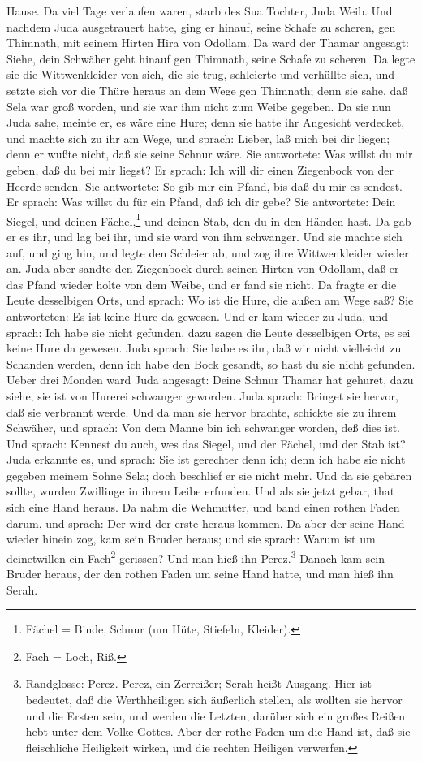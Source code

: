 \begin{schriftzitat}
Hause. Da viel Tage verlaufen waren, starb des Sua Tochter, Juda Weib. Und nachdem Juda ausgetrauert hatte, ging er hinauf, seine Schafe zu scheren, gen Thimnath, mit seinem Hirten Hira von Odollam. Da ward der Thamar angesagt: Siehe, dein Schwäher geht hinauf gen Thimnath, seine Schafe zu scheren. Da legte sie die Wittwenkleider von sich, die sie trug, schleierte und verhüllte sich, und setzte sich vor die Thüre heraus an dem Wege gen Thimnath; denn sie sahe, daß Sela war groß worden, und sie war ihm nicht zum Weibe gegeben. Da sie nun Juda sahe, meinte er, es wäre eine Hure; denn sie hatte ihr Angesicht verdecket, und machte sich zu ihr am Wege, und sprach: Lieber, laß mich bei dir liegen; denn er wußte nicht, daß sie seine Schnur wäre. Sie antwortete: Was willst du mir geben, daß du bei mir liegst? Er sprach: Ich will dir einen Ziegenbock von der Heerde senden. Sie antwortete: So gib mir ein Pfand, bis daß du mir es sendest. Er sprach: Was willst du für ein Pfand, daß ich dir gebe? Sie antwortete: Dein Siegel, und deinen Fächel,\footnote{Fächel = Binde, Schnur (um Hüte, Stiefeln, Kleider).} und deinen Stab, den du in den Händen hast. Da gab er es ihr, und lag bei ihr, und sie ward von ihm schwanger. Und sie machte sich auf, und ging hin, und legte den Schleier ab, und zog ihre Wittwenkleider wieder an. Juda aber sandte den Ziegenbock durch seinen Hirten von Odollam, daß er das Pfand wieder holte von dem Weibe, und er fand sie nicht. Da fragte er die Leute desselbigen Orts, und sprach: Wo ist die Hure, die außen am Wege saß? Sie antworteten: Es ist keine Hure da gewesen. Und er kam wieder zu Juda, und sprach: Ich habe sie nicht gefunden, dazu sagen die Leute desselbigen Orts, es sei keine Hure da gewesen. Juda sprach: Sie habe es ihr, daß wir nicht vielleicht zu Schanden werden, denn ich habe den Bock gesandt, so hast du sie nicht gefunden. Ueber drei Monden ward Juda angesagt: Deine Schnur Thamar hat gehuret, dazu siehe, sie ist von Hurerei schwanger geworden. Juda sprach: Bringet sie hervor, daß sie verbrannt werde. Und da man sie hervor brachte, schickte sie zu ihrem Schwäher, und sprach: Von dem Manne bin ich schwanger worden, deß dies ist. Und sprach: Kennest du auch, wes das Siegel, und der Fächel, und der Stab ist? Juda erkannte es, und sprach: Sie ist gerechter denn ich; denn ich habe sie nicht gegeben meinem Sohne Sela; doch beschlief er sie nicht mehr. Und da sie gebären sollte, wurden Zwillinge in ihrem Leibe erfunden. Und als sie jetzt gebar, that sich eine Hand heraus. Da nahm die Wehmutter, und band einen rothen Faden darum, und sprach: Der wird der erste heraus kommen. Da aber der seine Hand wieder hinein zog, kam sein Bruder heraus; und sie sprach: Warum ist um deinetwillen ein Fach\footnote{Fach = Loch, Riß.} gerissen? Und man hieß ihn Perez.\footnote{Randglosse: Perez. Perez, ein Zerreißer; Serah heißt Ausgang. Hier ist bedeutet, daß die Werthheiligen sich äußerlich stellen, als wollten sie hervor und die Ersten sein, und werden die Letzten, darüber sich ein großes Reißen hebt unter dem Volke Gottes. Aber der rothe Faden um die Hand ist, daß sie fleischliche Heiligkeit wirken, und die rechten Heiligen verwerfen.} Danach kam sein Bruder heraus, der den rothen Faden um seine Hand hatte, und man hieß ihn Serah.

\end{schriftzitat}
